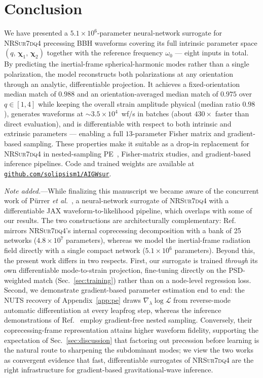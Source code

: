 \documentclass[aps,prd,twocolumn,superscriptaddress,longbibliography]{revtex4-2}
\newcommand{\NRSur}{\textsc{NRSur7dq4}}
\begin{document}
\section{Conclusion}
\label{sec:conclusion}

We have presented a $5.1\times10^6$-parameter neural-network
surrogate for \NRSur{} precessing BBH waveforms covering
its full intrinsic parameter space
$(q,\,\boldsymbol{\chi}_1,\,\boldsymbol{\chi}_2)$
together with the reference frequency $\omega_0$ ---
eight inputs in total.
By predicting the inertial-frame spherical-harmonic modes rather than a
single polarization, the model reconstructs both polarizations at any
orientation through an analytic, differentiable projection. It achieves a
fixed-orientation median match of $0.988$ and an orientation-averaged median
match of $0.975$ over $q\in[1,4]$ while keeping the overall strain amplitude
physical (median ratio $0.98$), generates waveforms at ${\sim}3.5\times10^4$~wf/s in batches
(about $430\times$ faster than direct evaluation), and is differentiable with
respect to both intrinsic and extrinsic parameters --- enabling a full
$13$-parameter Fisher matrix and gradient-based sampling.
These properties make it suitable as a drop-in replacement
for \NRSur{} in nested-sampling
PE~\cite{Skilling:2006,Veitch:2015,Ashton:2019,Speagle:2020},
Fisher-matrix studies, and gradient-based inference pipelines.
Code and trained weights are available at
\href{https://github.com/solipsism1/AIGWsur}{\texttt{github.com/solipsism1/AIGWsur}}.


\medskip
\noindent\emph{Note added.}---While finalizing this manuscript we became aware of
the concurrent work of P\"urrer \emph{et al.}~\cite{Puerrer:2026}, a
neural-network surrogate of \NRSur{} with a differentiable \textsc{JAX}
waveform-to-likelihood pipeline, which overlaps with some of our results. The two
constructions are architecturally complementary: Ref.~\cite{Puerrer:2026} mirrors
\NRSur{}'s internal coprecessing decomposition with a bank of 25 networks
($4.8\times10^{7}$ parameters), whereas we model the inertial-frame radiation
field directly with a single compact network ($5.1\times10^{6}$ parameters).
Beyond this, the present work differs in two respects. First, our surrogate is
trained \emph{through} its own differentiable mode-to-strain projection,
fine-tuning directly on the PSD-weighted match (Sec.~\ref{sec:training}) rather
than on a node-level regression loss. Second, we demonstrate gradient-based
parameter estimation end to end: the NUTS recovery of Appendix~\ref{app:pe} draws
$\nabla_{\lambda}\log\mathcal{L}$ from reverse-mode automatic differentiation at
every leapfrog step, whereas the inference demonstrations of
Ref.~\cite{Puerrer:2026} employ gradient-free nested sampling. Conversely, their
coprecessing-frame representation attains higher waveform fidelity, supporting
the expectation of Sec.~\ref{sec:discussion} that factoring out precession before
learning is the natural route to sharpening the subdominant modes; we view the
two works as convergent evidence that fast, differentiable surrogates of \NRSur{}
are the right infrastructure for gradient-based gravitational-wave inference.
\end{document}

